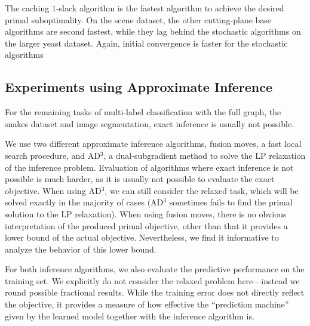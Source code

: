 The caching $1$-slack algorithm is the fastest algorithm to achieve the desired primal suboptimality.
On the scene dataset, the other cutting-plane base algorithms are second fastest, while they
lag behind the stochastic algorithms on the larger yeast dataset. Again, initial convergence is
faster for the stochastic algorithms


\subsection{Experiments using Approximate Inference}
For the remaining tasks of multi-label classification with the full graph, the
snakes dataset and image segmentation, exact inference is usually not possible.

We use two different approximate inference algorithms, fusion moves, a fast
local search procedure, and AD$^3$, a dual-subgradient method to solve the LP
relaxation of the inference problem.
Evaluation of algorithms where exact inference is not possible is much harder,
as it is usually not possible to evaluate the exact objective. When using AD$^3$,
we can still consider the relaxed task, which will be solved exactly in the
majority of cases (AD$^3$ sometimes fails to find the primal solution to the LP
relaxation). %
When using fusion moves, there is no obvious interpretation of the produced
primal objective, other than that it provides a lower bound of the actual
objective. Nevertheless, we find it informative to analyze the behavior of this lower bound.

For both inference algorithms, we also evaluate the predictive performance on
the training set.  We explicitly do not consider the relaxed problem
here---instead we round possible fractional results.
While the training error does not directly reflect the objective, it provides
a measure of how effective the ``prediction machine'' given by the learned model
together with the inference algorithm is.

